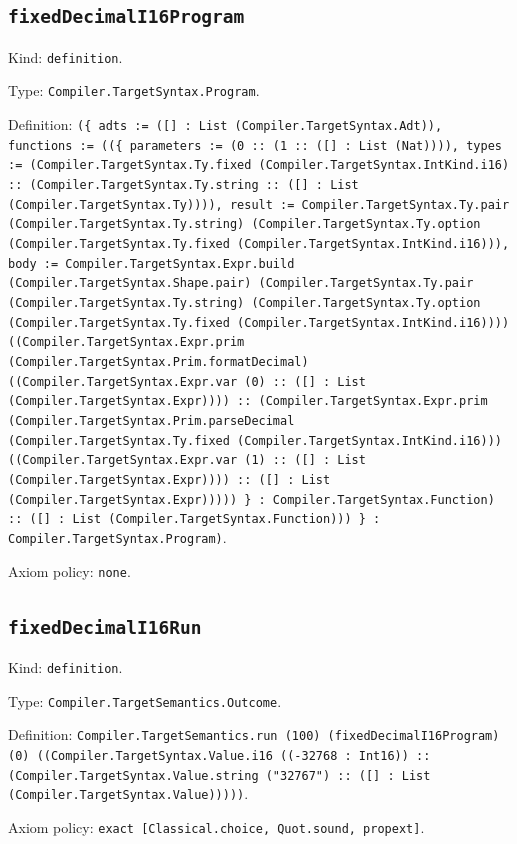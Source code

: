 \documentclass[11pt]{article}
\begin{document}
\subsection*{\texttt{fixedDecimalI16Program}}
\noindent Kind: \texttt{definition}.\par
\noindent Type: \texttt{Compiler.TargetSyntax.Program}.\par
\noindent Definition: \texttt{(\{ adts := ([] : List (Compiler.TargetSyntax.Adt)), functions := ((\{ parameters := (0 :: (1 :: ([] : List (Nat)))), types := (Compiler.TargetSyntax.Ty.fixed (Compiler.TargetSyntax.IntKind.i16) :: (Compiler.TargetSyntax.Ty.string :: ([] : List (Compiler.TargetSyntax.Ty)))), result := Compiler.TargetSyntax.Ty.pair (Compiler.TargetSyntax.Ty.string) (Compiler.TargetSyntax.Ty.option (Compiler.TargetSyntax.Ty.fixed (Compiler.TargetSyntax.IntKind.i16))), body := Compiler.TargetSyntax.Expr.build (Compiler.TargetSyntax.Shape.pair) (Compiler.TargetSyntax.Ty.pair (Compiler.TargetSyntax.Ty.string) (Compiler.TargetSyntax.Ty.option (Compiler.TargetSyntax.Ty.fixed (Compiler.TargetSyntax.IntKind.i16)))) ((Compiler.TargetSyntax.Expr.prim (Compiler.TargetSyntax.Prim.formatDecimal) ((Compiler.TargetSyntax.Expr.var (0) :: ([] : List (Compiler.TargetSyntax.Expr)))) :: (Compiler.TargetSyntax.Expr.prim (Compiler.TargetSyntax.Prim.parseDecimal (Compiler.TargetSyntax.Ty.fixed (Compiler.TargetSyntax.IntKind.i16))) ((Compiler.TargetSyntax.Expr.var (1) :: ([] : List (Compiler.TargetSyntax.Expr)))) :: ([] : List (Compiler.TargetSyntax.Expr))))) \} : Compiler.TargetSyntax.Function) :: ([] : List (Compiler.TargetSyntax.Function))) \} : Compiler.TargetSyntax.Program)}.\par
\noindent Axiom policy: \texttt{none}.\par
\subsection*{\texttt{fixedDecimalI16Run}}
\noindent Kind: \texttt{definition}.\par
\noindent Type: \texttt{Compiler.TargetSemantics.Outcome}.\par
\noindent Definition: \texttt{Compiler.TargetSemantics.run (100) (fixedDecimalI16Program) (0) ((Compiler.TargetSyntax.Value.i16 ((-32768 : Int16)) :: (Compiler.TargetSyntax.Value.string ("32767") :: ([] : List (Compiler.TargetSyntax.Value)))))}.\par
\noindent Axiom policy: \texttt{exact [Classical.choice, Quot.sound, propext]}.\par
\end{document}
